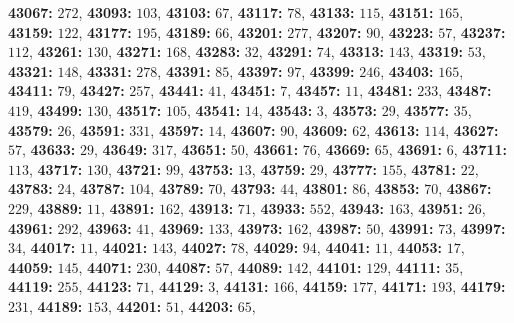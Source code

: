 \textsf{\bfseries 43067:} $272$, \textsf{\bfseries 43093:} $103$, \textsf{\bfseries 43103:} $67$, \textsf{\bfseries 43117:} $78$, \textsf{\bfseries 43133:} $115$, \textsf{\bfseries 43151:} $165$, \textsf{\bfseries 43159:} $122$, \textsf{\bfseries 43177:} $195$, \textsf{\bfseries 43189:} $66$, \textsf{\bfseries 43201:} $277$, \textsf{\bfseries 43207:} $90$, \textsf{\bfseries 43223:} $57$, \textsf{\bfseries 43237:} $112$, \textsf{\bfseries 43261:} $130$, \textsf{\bfseries 43271:} $168$, \textsf{\bfseries 43283:} $32$, \textsf{\bfseries 43291:} $74$, \textsf{\bfseries 43313:} $143$, \textsf{\bfseries 43319:} $53$, \textsf{\bfseries 43321:} $148$, \textsf{\bfseries 43331:} $278$, \textsf{\bfseries 43391:} $85$, \textsf{\bfseries 43397:} $97$, \textsf{\bfseries 43399:} $246$, \textsf{\bfseries 43403:} $165$, \textsf{\bfseries 43411:} $79$, \textsf{\bfseries 43427:} $257$, \textsf{\bfseries 43441:} $41$, \textsf{\bfseries 43451:} $7$, \textsf{\bfseries 43457:} $11$, \textsf{\bfseries 43481:} $233$, \textsf{\bfseries 43487:} $419$, \textsf{\bfseries 43499:} $130$, \textsf{\bfseries 43517:} $105$, \textsf{\bfseries 43541:} $14$, \textsf{\bfseries 43543:} $3$, \textsf{\bfseries 43573:} $29$, \textsf{\bfseries 43577:} $35$, \textsf{\bfseries 43579:} $26$, \textsf{\bfseries 43591:} $331$, \textsf{\bfseries 43597:} $14$, \textsf{\bfseries 43607:} $90$, \textsf{\bfseries 43609:} $62$, \textsf{\bfseries 43613:} $114$, \textsf{\bfseries 43627:} $57$, \textsf{\bfseries 43633:} $29$, \textsf{\bfseries 43649:} $317$, \textsf{\bfseries 43651:} $50$, \textsf{\bfseries 43661:} $76$, \textsf{\bfseries 43669:} $65$, \textsf{\bfseries 43691:} $6$, \textsf{\bfseries 43711:} $113$, \textsf{\bfseries 43717:} $130$, \textsf{\bfseries 43721:} $99$, \textsf{\bfseries 43753:} $13$, \textsf{\bfseries 43759:} $29$, \textsf{\bfseries 43777:} $155$, \textsf{\bfseries 43781:} $22$, \textsf{\bfseries 43783:} $24$, \textsf{\bfseries 43787:} $104$, \textsf{\bfseries 43789:} $70$, \textsf{\bfseries 43793:} $44$, \textsf{\bfseries 43801:} $86$, \textsf{\bfseries 43853:} $70$, \textsf{\bfseries 43867:} $229$, \textsf{\bfseries 43889:} $11$, \textsf{\bfseries 43891:} $162$, \textsf{\bfseries 43913:} $71$, \textsf{\bfseries 43933:} $552$, \textsf{\bfseries 43943:} $163$, \textsf{\bfseries 43951:} $26$, \textsf{\bfseries 43961:} $292$, \textsf{\bfseries 43963:} $41$, \textsf{\bfseries 43969:} $133$, \textsf{\bfseries 43973:} $162$, \textsf{\bfseries 43987:} $50$, \textsf{\bfseries 43991:} $73$, \textsf{\bfseries 43997:} $34$, \textsf{\bfseries 44017:} $11$, \textsf{\bfseries 44021:} $143$, \textsf{\bfseries 44027:} $78$, \textsf{\bfseries 44029:} $94$, \textsf{\bfseries 44041:} $11$, \textsf{\bfseries 44053:} $17$, \textsf{\bfseries 44059:} $145$, \textsf{\bfseries 44071:} $230$, \textsf{\bfseries 44087:} $57$, \textsf{\bfseries 44089:} $142$, \textsf{\bfseries 44101:} $129$, \textsf{\bfseries 44111:} $35$, \textsf{\bfseries 44119:} $255$, \textsf{\bfseries 44123:} $71$, \textsf{\bfseries 44129:} $3$, \textsf{\bfseries 44131:} $166$, \textsf{\bfseries 44159:} $177$, \textsf{\bfseries 44171:} $193$, \textsf{\bfseries 44179:} $231$, \textsf{\bfseries 44189:} $153$, \textsf{\bfseries 44201:} $51$, \textsf{\bfseries 44203:} $65$, 
